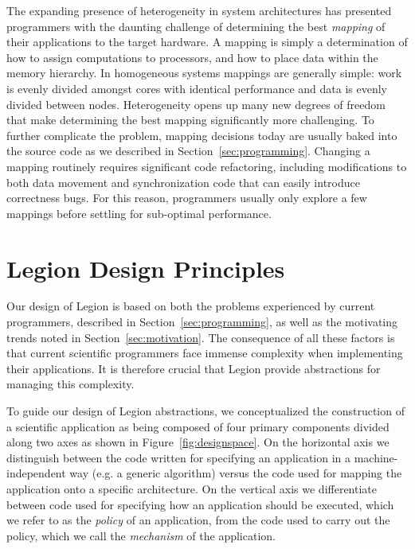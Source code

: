The expanding presence of heterogeneity in system
architectures has presented programmers with the 
daunting challenge of determining the best {\em mapping}
of their applications to the target hardware. A mapping
is simply a determination of how to assign computations
to processors, and how to place data within the
memory hierarchy. In homogeneous systems mappings are generally 
simple: work is evenly divided amongst cores 
with identical performance and data is evenly 
divided between nodes. Heterogeneity opens up many
new degrees of freedom that make 
determining the best mapping significantly more
challenging. To further complicate the problem, mapping
decisions today are usually baked into the source code
as we described in Section~\ref{sec:programming}. Changing 
a mapping routinely requires significant code refactoring, 
including modifications to both data movement and synchronization 
code that can easily introduce correctness bugs. 
For this reason, programmers usually only explore a few 
mappings before settling for sub-optimal performance. 


\section{Legion Design Principles}
\label{sec:design}
Our design of Legion is based on both the problems
experienced by current programmers, described
in Section~\ref{sec:programming}, as well as the
motivating trends noted in Section~\ref{sec:motivation}.
The consequence of all these factors is that
current scientific programmers face immense complexity
when implementing their applications. It is therefore
crucial that Legion provide abstractions for
managing this complexity.

To guide our design of Legion abstractions, we 
conceptualized the construction of a scientific 
application as being composed of four primary 
components divided along two axes as shown in 
Figure~\ref{fig:designspace}. On the horizontal axis 
we distinguish between the code written for specifying 
an application in a machine-independent way (e.g. a 
generic algorithm) versus the code used for mapping
the application onto a specific architecture.
On the vertical axis we differentiate between
code used for specifying how an application
should be executed, which we refer to as the 
{\em policy} of an application, from the code 
used to carry out the policy, which we call 
the {\em mechanism} of the application.

